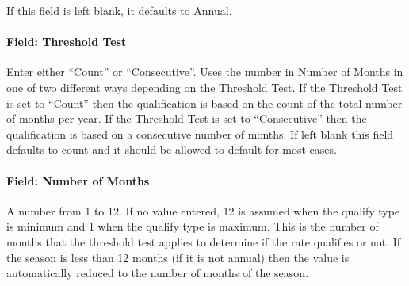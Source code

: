 If this field is left blank, it defaults to Annual.

\paragraph{Field: Threshold Test}\label{field-threshold-test}

Enter either ``Count'' or ``Consecutive''. Uses the number in Number of Months in one of two different ways depending on the Threshold Test. If the Threshold Test is set to ``Count'' then the qualification is based on the count of the total number of months per year. If the Threshold Test is set to ``Consecutive'' then the qualification is based on a consecutive number of months. If left blank this field defaults to count and it should be allowed to default for most cases.

\paragraph{Field: Number of Months}\label{field-number-of-months}

A number from 1 to 12. If no value entered, 12 is assumed when the qualify type is minimum and 1 when the qualify type is maximum. This is the number of months that the threshold test applies to determine if the rate qualifies or not. If the season is less than 12 months (if it is not annual) then the value is automatically reduced to the number of months of the season.